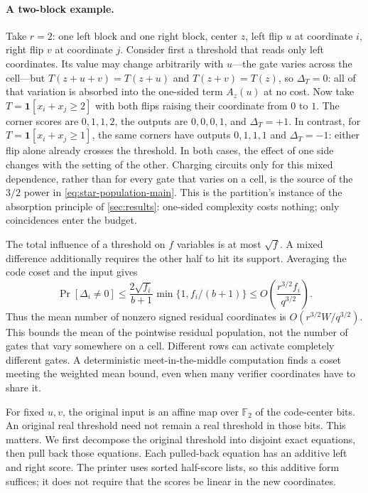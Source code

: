 \documentclass[11pt,letterpaper]{article}
\theoremstyle{definition}
\theoremstyle{remark}
\newcommand{\F}{\mathbb F}
\newcommand{\ind}{\mathbf 1}
\begin{document}
\paragraph{A two-block example.}
Take $r=2$: one left block and one right block, center $z$, left flip
$u$ at coordinate $i$, right flip $v$ at coordinate $j$. Consider
first a threshold that reads only left coordinates. Its value may
change arbitrarily with $u$---the gate varies across the cell---but
$T(z{+}u{+}v)=T(z{+}u)$ and $T(z{+}v)=T(z)$, so $\Delta_T=0$: all of
that variation is absorbed into the one-sided term $A_z(u)$ at no
cost. Now take $T=\ind[x_i+x_j\ge2]$ with both flips raising their
coordinate from $0$ to $1$. The corner scores are $0,1,1,2$, the
outputs are $0,0,0,1$, and $\Delta_T=+1$. In contrast, for
$T=\ind[x_i+x_j\ge1]$, the same corners have outputs $0,1,1,1$
and $\Delta_T=-1$: either flip alone already crosses the threshold.
In both cases, the effect of one side changes with the setting of the
other. Charging circuits only for this mixed dependence, rather than
for every gate that varies on a cell, is the source of the $3/2$ power in
\cref{eq:star-population-main}. This is the partition's instance of
the absorption principle of \cref{sec:results}: one-sided complexity
costs nothing; only coincidences enter the budget.

The total influence of a threshold on $f$ variables is at most $\sqrt f$.
A mixed difference additionally requires the other half to hit its
support. Averaging the code coset and the input gives
\begin{equation}
\Pr[\Delta_i\ne0]\le
\frac{2\sqrt{f_i}}{b+1}\min\{1,f_i/(b+1)\}
\le O\!\left(\frac{r^{3/2}f_i}{q^{3/2}}\right).
\label{eq:star-population-main}
\end{equation}
Thus the mean number of nonzero signed residual coordinates is
$O(r^{3/2}W/q^{3/2})$. This bounds the mean of the pointwise residual
population, not the number of gates that vary somewhere on a cell.
Different rows can activate completely different gates. A deterministic
meet-in-the-middle computation finds a coset meeting the weighted mean
bound, even when many verifier coordinates have to share it.

For fixed $u,v$, the original input is an affine map over $\F_2$ of the
code-center bits. An original real threshold need not remain a real
threshold in those bits. This matters. We first decompose the original
threshold into disjoint exact equations, then pull back those equations.
Each pulled-back equation has an additive left and right score. The
printer uses sorted half-score lists, so this additive form suffices;
it does not require that the scores be linear in the new coordinates.
\end{document}
